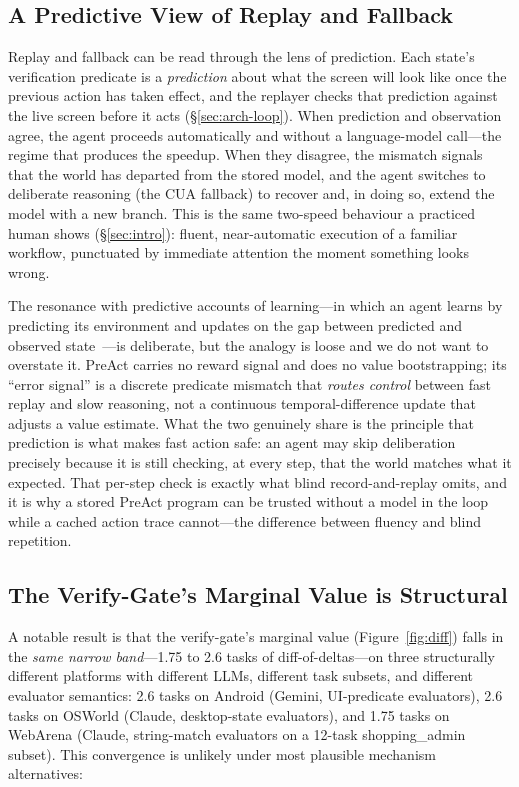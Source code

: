 \documentclass[11pt]{article}
\begin{document}
\subsection{A Predictive View of Replay and Fallback}
\label{sec:disc-predictive}

Replay and fallback can be read through the lens of prediction. Each state's verification predicate is a \emph{prediction} about what the screen will look like once the previous action has taken effect, and the replayer checks that prediction against the live screen before it acts (\S\ref{sec:arch-loop}). When prediction and observation agree, the agent proceeds automatically and without a language-model call---the regime that produces the speedup. When they disagree, the mismatch signals that the world has departed from the stored model, and the agent switches to deliberate reasoning (the CUA fallback) to recover and, in doing so, extend the model with a new branch. This is the same two-speed behaviour a practiced human shows (\S\ref{sec:intro}): fluent, near-automatic execution of a familiar workflow, punctuated by immediate attention the moment something looks wrong.

The resonance with predictive accounts of learning---in which an agent learns by predicting its environment and updates on the gap between predicted and observed state~\cite{sutton1988td,suttonbarto2018}---is deliberate, but the analogy is loose and we do not want to overstate it. PreAct carries no reward signal and does no value bootstrapping; its ``error signal'' is a discrete predicate mismatch that \emph{routes control} between fast replay and slow reasoning, not a continuous temporal-difference update that adjusts a value estimate. What the two genuinely share is the principle that prediction is what makes fast action safe: an agent may skip deliberation precisely because it is still checking, at every step, that the world matches what it expected. That per-step check is exactly what blind record-and-replay omits, and it is why a stored PreAct program can be trusted without a model in the loop while a cached action trace cannot---the difference between fluency and blind repetition.

\subsection{The Verify-Gate's Marginal Value is Structural}
\label{sec:disc-structural}

A notable result is that the verify-gate's marginal value (Figure~\ref{fig:diff}) falls in the \emph{same narrow band}---1.75 to 2.6 tasks of diff-of-deltas---on three structurally different platforms with different LLMs, different task subsets, and different evaluator semantics: 2.6 tasks on Android (Gemini, UI-predicate evaluators), 2.6 tasks on OSWorld (Claude, desktop-state evaluators), and 1.75 tasks on WebArena (Claude, string-match evaluators on a 12-task shopping\_admin subset). This convergence is unlikely under most plausible mechanism alternatives:
\end{document}
